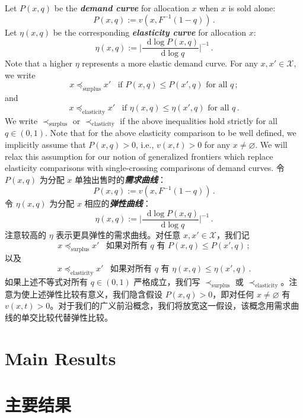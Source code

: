 \documentclass[12pt,letterpaper]{article}
\newenvironment{original}{\color{black}\noindent}{}
\newenvironment{translation}{\color{blue}\noindent}{}
\theoremstyle{plain}
\theoremstyle{definition}
\theoremstyle{remark}
\let\emptyset\varnothing
\renewcommand{\1}{\mathds{1}}
\renewcommand*\d{\mathop{}\!\mathrm{d}}
\theoremstyle{definition}
\begin{document}
\begin{original}
Let $P(x, q)$ be the \textit{\textbf{demand curve}} for allocation $x$ when $x$ is sold alone:
\[P(x, q) := v(x, F^{-1}(1 - q))\,.\]
Let $\eta(x, q)$ be the corresponding \textit{\textbf{elasticity curve}} for allocation $x$:
\[\eta(x, q) := \big|\frac{\d \log P(x, q)}{\d \log q}\big|^{-1} \,.\]
Note that a higher $\eta$ represents a more elastic demand curve. For any $x, x' \in \mathcal{X}$, we write
\[x \preceq_{\text{surplus}} x' \,\,\,\text{ if $P(x, q) \leq P(x', q)$ for all $q$}\,;\]
and
\[x \preceq_{\text{elasticity}} x' \,\,\,\text{ if $\eta(x, q) \leq \eta(x', q)$ for all $q$}\,.\]
We write $\prec_{\text{surplus}}$ or $\prec_{\text{elasticity}}$ if the above inequalities hold strictly for all $q \in (0, 1)$. Note that for the above elasticity comparison to be well defined, we implicitly assume that $P(x, q) > 0$, i.e., $v(x, t) > 0$ for any $x \neq \emptyset$. We will relax this assumption for our notion of generalized frontiers which replace elasticity comparisons with single-crossing comparisons of demand curves.
\end{original}
\begin{translation}
令 $P(x, q)$ 为分配 $x$ 单独出售时的\textit{\textbf{需求曲线}}：
\[P(x, q) := v(x, F^{-1}(1 - q))\,.\]
令 $\eta(x, q)$ 为分配 $x$ 相应的\textit{\textbf{弹性曲线}}：
\[\eta(x, q) := \big|\frac{\d \log P(x, q)}{\d \log q}\big|^{-1} \,.\]
注意较高的 $\eta$ 表示更具弹性的需求曲线。对任意 $x, x' \in \mathcal{X}$，我们记
\[x \preceq_{\text{surplus}} x' \,\,\,\text{ 如果对所有 $q$ 有 $P(x, q) \leq P(x', q)$}\,;\]
以及
\[x \preceq_{\text{elasticity}} x' \,\,\,\text{ 如果对所有 $q$ 有 $\eta(x, q) \leq \eta(x', q)$}\,.\]
如果上述不等式对所有 $q \in (0, 1)$ 严格成立，我们写 $\prec_{\text{surplus}}$ 或 $\prec_{\text{elasticity}}$。注意为使上述弹性比较有意义，我们隐含假设 $P(x, q) > 0$，即对任何 $x \neq \emptyset$ 有 $v(x, t) > 0$。对于我们的广义前沿概念，我们将放宽这一假设，该概念用需求曲线的单交比较代替弹性比较。
\end{translation}

\begin{original}
\section{Main Results}\label{sec:main}
\end{original}
\begin{translation}
\section{主要结果}\label{sec:main}
\end{translation}
\end{document}
